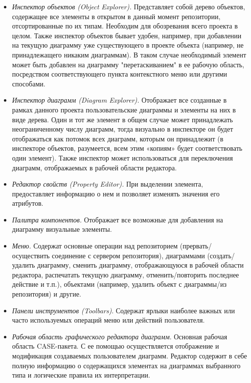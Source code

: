 \documentclass[a5paper]{article}
\begin{document}
\begin{itemize}
  \item \textit{Инспектор объектов (Object Explorer).} Представляет
	собой дерево объектов, содержащее все элементы в открытом в данный
	момент репозитории, отсортированные по их типам. Необходим для
	обозревания всего проекта в целом. Также инспектор объектов бывает
	удобен, например, при добавлении на текущую диаграмму уже существующего
	в проекте объекта (например, не принадлежащего никаким диаграммам). В
	таком случае необходимый элемент может быть добавлен на диаграмму
	"перетаскиванием" в ее рабочую область, посредством соответствующего
	пункта контекстного меню или другими способами.
  \item \textit{Инспектор диаграмм (Diagram Explorer).} Отображает все
	созданные в рамках данного проекта пользовательские диаграммы и
	элементы на них в виде дерева. Один и тот же элемент в общем случае
	может принадлежать неограниченному числу диаграмм, тогда визуально в
	инспекторе он будет отображаться как потомок всех диаграмм, которым он
	принадлежит (в инспекторе объектов, разумеется, всем этим «копиям»
	будет соответствовать один элемент). Также инспектор может
	использоваться для переключения диаграмм, отображаемых в рабочей
	области редактора.
  \item \textit{Редактор свойств (Property Editor).} При выделении
    элемента, предоставляет информацию о нем и позволяет изменять значения
	его атрибутов.
  \item \textit{Палитра компонентов.} Отображает все возможные для добавления на
	диаграмму визуальные элементы. 
  \item \textit{Меню.} Содержат основные операции над репозиторием
	(прервать/осуществить соединение с сервером репозитория), диаграммами
	(создать/удалить диаграмму, сменить диаграмму, отображающуюся в рабочей
	области редактора, распечатать текущую диаграмму, отменить/повторить
	последнее действие и т.п.), объектами (например, удалить объект с
	диаграммы/из репозитория) и другие.
  \item \textit{Панели инструментов (Toolbars)}. Содержат
	ярлыки наиболее важных или часто используемых операций меню или
	действий пользователя.
  \item \textit{Рабочая область графического редактора диаграмм}. Основная
	рабочая область CASE-пакета. С ее помощью
	осуществляется отображение и модификация создаваемых пользователем
	диаграмм. Редактор содержит в себе полную информацию о содержащихся
	элементах на диаграммах выбранного типа и логические правила их
	интерпретации.
\end{itemize}
\end{document}
